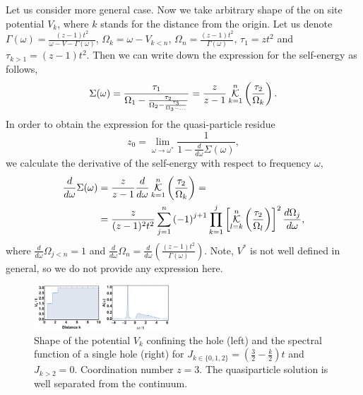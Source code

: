 \documentclass[%
 reprint,
 amsmath,amssymb,
 aps,
prb,
floatfix,
]{revtex4-1}
\newcommand{\K}{\operatornamewithlimits{\mathcal{K}}}
\begin{document}
Let us consider more general case. Now we take arbitrary shape of the on site potential $V_k$, where $k$ stands for the distance from the origin. Let us denote $\Gamma(\omega) = \frac{(z-1)t^2}{\omega - V - \Gamma(\omega)}$, $\Omega_k = \omega - V_{k<n}$, $\Omega_n = \frac{(z-1)t^2}{\Gamma(\omega)}$, $\tau_1 = zt^2$ and $\tau_{k>1} = (z-1)t^2$. Then we can write down the expression for the self-energy as follows,
\begin{equation}
\begin{aligned}
\Sigma(\omega) = \frac{\tau_1}{\Omega_1 - \frac{\tau_2}{\Omega_2 - \frac{\tau_3}{\Omega_3 - \hdots}}} = \frac{z}{z-1}\K_{k=1}^n \left(\frac{\tau_2}{\Omega_k}\right).
\end{aligned}
\end{equation}
In order to obtain the expression for the quasi-particle residue 
\begin{equation}
z_0 = \lim_{\omega\to\omega^*}\frac{1}{1-\frac{d}{d\omega}\Sigma(\omega)},
\end{equation}
we calculate the derivative of the self-energy with respect to frequency $\omega$,
\begin{equation}
\begin{aligned}
\frac{d}{d\omega} \Sigma(\omega) &= \frac{z}{z-1} \frac{d}{d\omega} \K_{k=1}^n \left(\frac{\tau_2}{\Omega_k}\right) = \\
&= \frac{z}{(z-1)^2t^2}\sum_{j=1}^n \left(-1 \right)^{j+1} \prod_{k=1}^j \left[ \K_{l=k}^n \left(\frac{\tau_2}{\Omega_l}\right) \right]^2 \frac{d\Omega_j}{d\omega},
\end{aligned}
\end{equation}
where $\frac{d}{d\omega}\Omega_{j<n} = 1$ and $\frac{d}{d\omega}\Omega_n = \frac{d}{d\omega}\left( \frac{(z-1)t^2}{\Gamma(\omega)} \right)$. Note, $V^*$ is not well defined in general, so we do not provide any expression here.
~~
\begin{figure}[ht!]
\centering
\includegraphics[width=0.45\textwidth]{anypot}
\caption{Shape of the potential $V_k$ confining the hole (left) and the spectral function of a single hole (right) for $J_{k \in \{0,1,2\}} = (\frac{3}{2}-\frac{k}{2})t$ and $J_{k>2} = 0$. Coordination number $z = 3$. The quasiparticle solution is well separated from the continuum.}
\end{figure}
\end{document}
